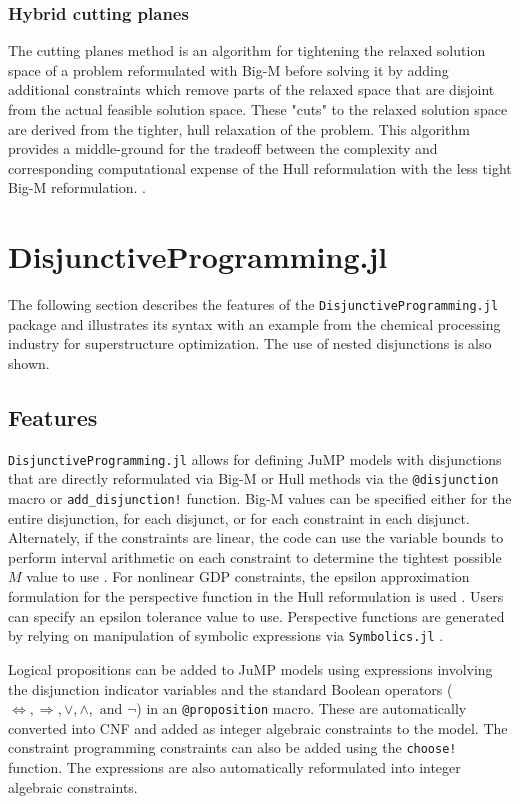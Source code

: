 \documentclass{juliacon}
\begin{document}
\subsubsection{Hybrid cutting planes}
The cutting planes method is an algorithm for tightening the relaxed solution space of a problem reformulated with Big-M before solving it by adding additional constraints which remove parts of the relaxed space that are disjoint from the actual feasible solution space. These "cuts" to the relaxed solution space are derived from the tighter, hull relaxation of the problem. This algorithm provides a middle-ground for the tradeoff between the complexity and corresponding computational expense of the Hull reformulation with the less tight Big-M reformulation. \cite{trespalacios_grossmann_2016}. 

\section{DisjunctiveProgramming.jl}
The following section describes the features of the \verb|DisjunctiveProgramming.jl| package and illustrates its syntax with an example from the chemical processing industry for superstructure optimization. The use of nested disjunctions is also shown.

\subsection{Features}
\verb|DisjunctiveProgramming.jl| allows for defining JuMP models with disjunctions that are directly reformulated via Big-M or Hull methods via the \verb|@disjunction| macro or \verb|add_disjunction!| function. Big-M values can be specified either for the entire disjunction, for each disjunct, or for each constraint in each disjunct. Alternately, if the constraints are linear, the code can use the variable bounds to perform interval arithmetic on each constraint to determine the tightest possible $M$ value to use \cite{agarwal2010automating}. For nonlinear GDP constraints, the epsilon approximation formulation for the perspective function in the Hull reformulation is used \cite{furman_sawaya_grossmann_2020}. Users can specify an epsilon tolerance value to use. Perspective functions are generated by relying on manipulation of symbolic expressions via \verb|Symbolics.jl| \cite{10.1145/3511528.3511535}.

\vskip 6pt
Logical propositions can be added to JuMP models using expressions involving the disjunction indicator variables and the standard Boolean operators ($\Leftrightarrow, \Rightarrow, \vee, \wedge, \text{ and } \neg$) in an \verb|@proposition| macro. These are automatically converted into CNF and added as integer algebraic constraints to the model. The constraint programming constraints can also be added using the \verb|choose!| function. The expressions are also automatically reformulated into integer algebraic constraints.
\end{document}
